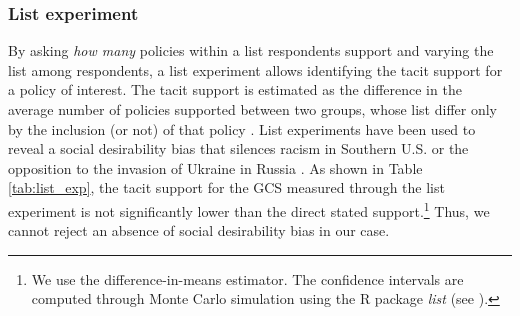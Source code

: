 \subsubsection{List experiment}\label{subsubsec:list_exp}  %

By asking \textit{how many} policies within a list respondents support and varying the list among respondents, a list experiment allows identifying the tacit support for a policy of interest. The tacit support is estimated as the difference in the average number of policies supported between two groups, whose list differ only by the inclusion (or not) of that policy \citep{hainmueller_causal_2014}.%
List experiments have been used to reveal a social desirability bias that silences racism in Southern U.S. \citep{kuklinski_racial_1997} or the opposition to the invasion of Ukraine in Russia \citep{chapkovski_solid_2022}. %
As shown in Table \ref{tab:list_exp}, the tacit support for the GCS measured through the list experiment is not significantly lower than the direct stated support.\footnote{We use the difference-in-means estimator. The confidence intervals are computed through Monte Carlo simulation using the R package \textit{list} (see \citealp{imai_multivariate_2011}).} Thus, we cannot reject an absence of social desirability bias in our case.

